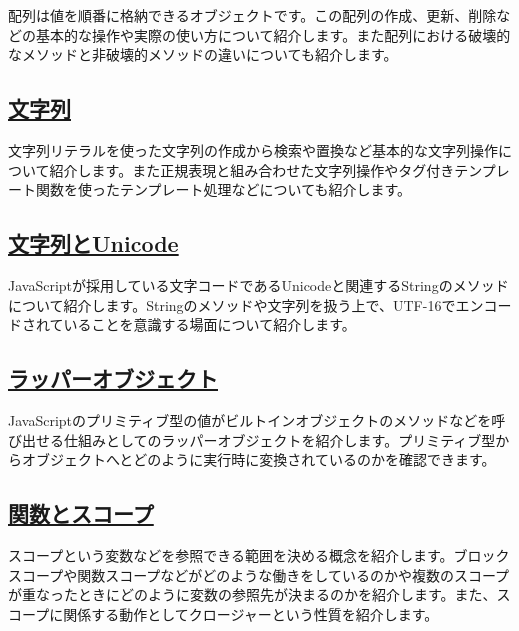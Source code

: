 配列は値を順番に格納できるオブジェクトです。この配列の作成、更新、削除などの基本的な操作や実際の使い方について紹介します。また配列における破壊的なメソッドと非破壊的メソッドの違いについても紹介します。

\hypertarget{string}{%
\subsection*{\texorpdfstring{\href{./string/README.md}{文字列}}{文字列}}\label{string}}

文字列リテラルを使った文字列の作成から検索や置換など基本的な文字列操作について紹介します。また正規表現と組み合わせた文字列操作やタグ付きテンプレート関数を使ったテンプレート処理などについても紹介します。

\hypertarget{string-unicode}{%
\subsection*{\texorpdfstring{\href{./string-unicode/README.md}{文字列とUnicode}}{文字列とUnicode}}\label{string-unicode}}

JavaScriptが採用している文字コードであるUnicodeと関連するStringのメソッドについて紹介します。Stringのメソッドや文字列を扱う上で、UTF-16でエンコードされていることを意識する場面について紹介します。

\hypertarget{wrapper-object}{%
\subsection*{\texorpdfstring{\href{./wrapper-object/README.md}{ラッパーオブジェクト}}{ラッパーオブジェクト}}\label{wrapper-object}}

JavaScriptのプリミティブ型の値がビルトインオブジェクトのメソッドなどを呼び出せる仕組みとしてのラッパーオブジェクトを紹介します。プリミティブ型からオブジェクトへとどのように実行時に変換されているのかを確認できます。

\hypertarget{function-scope}{%
\subsection*{\texorpdfstring{\href{./function-scope/README.md}{関数とスコープ}}{関数とスコープ}}\label{function-scope}}

スコープという変数などを参照できる範囲を決める概念を紹介します。ブロックスコープや関数スコープなどがどのような働きをしているのかや複数のスコープが重なったときにどのように変数の参照先が決まるのかを紹介します。また、スコープに関係する動作としてクロージャーという性質を紹介します。

